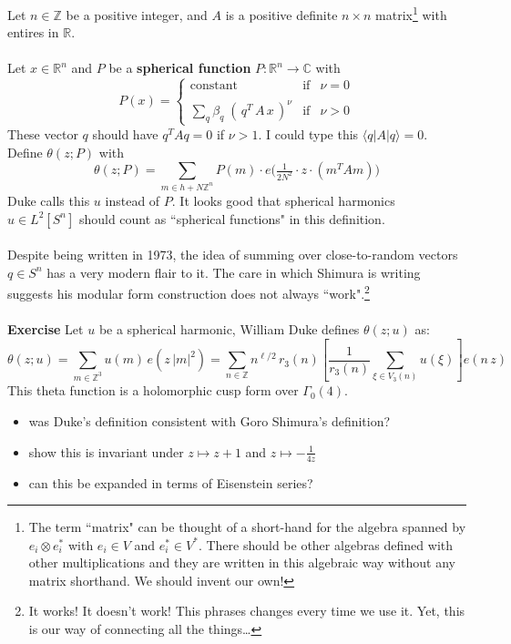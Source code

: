\documentclass[12pt]{article}
\begin{document}
\newpage
\noindent Let $n \in \mathbb{Z}$ be a positive integer, and $A$ is a positive definite $n \times n$ matrix\footnote{The term ``matrix" can be thought of a short-hand for the algebra spanned by $e_i \otimes e_i^*$ with $e_i \in V$ and $e_i^* \in V^*$.  There should be other algebras defined with other multiplications and they are written in this algebraic way without any matrix shorthand.  We should invent our own!} with entires in $\mathbb{R}$.  \\ \\
Let $x \in \mathbb{R}^n$ and $P$ be a \textbf{spherical function} $P: \mathbb{R}^n \to \mathbb{C}$ with 
$$ P(x) = \left\{ \begin{array}{lcc} 
\text{constant} & \text{if} & \nu=0  \\ \\
\displaystyle \sum_q \beta_q \;( \, q^T \, A \, x \,)^\nu & \text{if} & \nu>0
\end{array} \right. $$
These vector $q$ should have $q^T A q = 0$ if $\nu > 1$. I could type this $\langle q | A | q \rangle = 0$. Define $\theta(z;P)$ with
$$ \theta(z;P) = \sum_{m \in h + N \mathbb{Z}^n} P(m) \cdot e 
\Big( \tfrac{1}{2N^2} \cdot z \cdot (m^T A m)  \Big) $$
Duke calls this $u$ instead of $P$.  It looks good that spherical harmonics $u \in L^2[S^n]$ should count as ``spherical functions" in this definition. \\ \\
Despite being written in 1973, the idea of summing over close-to-random vectors $q \in S^n $ has a very modern flair to it.  The care in which Shimura is writing suggests his modular form construction does not always ``work".\footnote{It works!  It doesn't work!  This phrases changes every time we use it.  Yet, this is our way of connecting all the things\dots} \\ \\
\textbf{Exercise}  Let $u$ be a spherical harmonic, William Duke defines $\theta(z;u)$ as:
$$ \theta(z;u) = \sum_{m \in \mathbb{Z}^3} u(m) \,e(z \,|m|^2 )  
= \sum_{n \in \mathbb{Z}} n^{\ell/2} \, r_3(n)
\left[  \frac{1}{r_3(n)} \sum_{\xi \in V_3(n)} u(\xi) \right] 
e ( n\, z)$$
This theta function is a holomorphic cusp form over $\Gamma_0(4)$.
\begin{itemize}
\item was Duke's definition consistent with Goro Shimura's definition?
\item show this is invariant under $z \mapsto z + 1$ and $z \mapsto - \frac{1}{4z}$
\item can this be expanded in terms of Eisenstein series?
\end{itemize}
\end{document}
